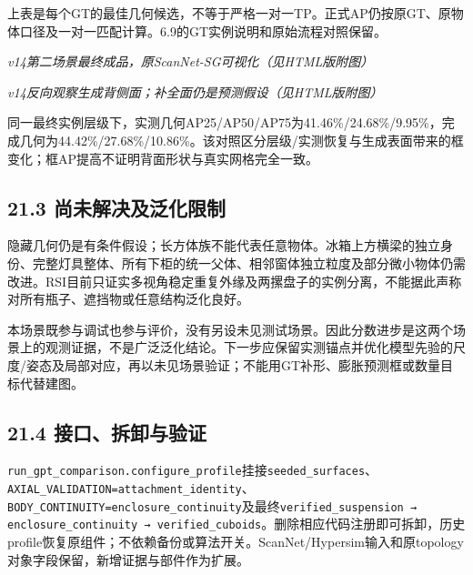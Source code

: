 \documentclass[UTF8,fontset=fandol]{ctexart}
\begin{document}
上表是每个GT的最佳几何候选，不等于严格一对一TP。正式AP仍按原GT、原物体口径及一对一匹配计算。6.9的GT实例说明和原始流程对照保留。



\textit{v14第二场景最终成品，原ScanNet-SG可视化（见HTML版附图）}



\textit{v14反向观察生成背侧面；补全面仍是预测假设（见HTML版附图）}



同一最终实例层级下，实测几何AP25/AP50/AP75为41.46\%/24.68\%/9.95\%，完成几何为44.42\%/27.68\%/10.86\%。该对照区分层级/实测恢复与生成表面带来的框变化；框AP提高不证明背面形状与真实网格完全一致。



\subsection*{21.3 尚未解决及泛化限制}

隐藏几何仍是有条件假设；长方体族不能代表任意物体。冰箱上方横梁的独立身份、完整灯具整体、所有下柜的统一父体、相邻窗体独立粒度及部分微小物体仍需改进。RSI目前只证实多视角稳定重复外缘及两摞盘子的实例分离，不能据此声称对所有瓶子、遮挡物或任意结构泛化良好。



本场景既参与调试也参与评价，没有另设未见测试场景。因此分数进步是这两个场景上的观测证据，不是广泛泛化结论。下一步应保留实测锚点并优化模型先验的尺度/姿态及局部对应，再以未见场景验证；不能用GT补形、膨胀预测框或数量目标代替建图。



\subsection*{21.4 接口、拆卸与验证}

\texttt{run\_\allowbreak{}gpt\_\allowbreak{}comparison.\allowbreak{}configure\_\allowbreak{}profile}挂接\texttt{seeded\_\allowbreak{}surfaces}、\texttt{AXIAL\_\allowbreak{}VALIDATION=attachment\_\allowbreak{}identity}、\texttt{BODY\_\allowbreak{}CONTINUITY=enclosure\_\allowbreak{}continuity}及最终\texttt{verified\_\allowbreak{}suspension → enclosure\_\allowbreak{}continuity → verified\_\allowbreak{}cuboids}。删除相应代码注册即可拆卸，历史profile恢复原组件；不依赖备份或算法开关。ScanNet/Hypersim输入和原topology对象字段保留，新增证据与部件作为扩展。
\end{document}
